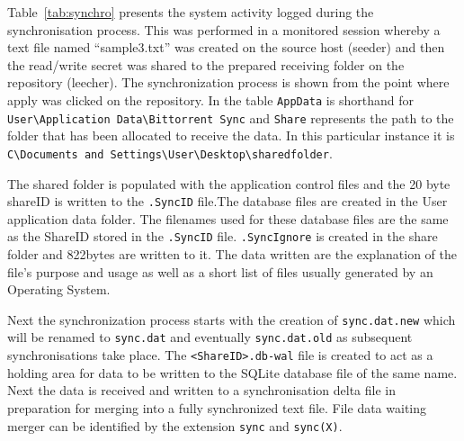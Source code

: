 \documentclass[final,5p,times,twocolumn]{elsarticle}
\begin{document}
Table~\ref{tab:synchro} presents the system activity logged during the synchronisation process. This was performed in a monitored session whereby a text file named ``sample3.txt'' was created on the source host (seeder) and then the read/write secret was shared to the prepared receiving folder on the repository (leecher).
The synchronization process is shown from the point where apply was clicked on the repository. In the table \texttt{AppData} is shorthand for \\\texttt{{\selectfont\texttildelow}User\textbackslash Application Data\textbackslash Bittorrent Sync} and \texttt{Share} represents the path to the folder that has been allocated to receive the data. In this particular instance it is \texttt{C\textbackslash Documents and Settings\textbackslash User\textbackslash Desktop\textbackslash sharedfolder}.

The shared folder is populated with the application control files and the 20 byte shareID is written to the \texttt{.SyncID} file.The database files are created in the User application data folder. The filenames used for these database files are the same as the ShareID stored in the \texttt{.SyncID} file. \texttt{.SyncIgnore} is created in the share folder and 822bytes are written to it. The data written are the explanation of the file's purpose and usage as well as a short list of
files usually generated by an Operating System.

Next the synchronization process starts with the creation of \texttt{sync.dat.new} which will be renamed to \texttt{sync.dat} and eventually \texttt{sync.dat.old} as subsequent synchronisations take place. The \texttt{<ShareID>.db-wal} file is created to act as a holding area for data to be written to the SQLite database file of the same name. Next the data is received and written to a synchronisation delta file in preparation for merging into a fully synchronized text file. File data waiting merger can be identified by the extension \texttt{sync} and \texttt{sync(X)}.
\end{document}
